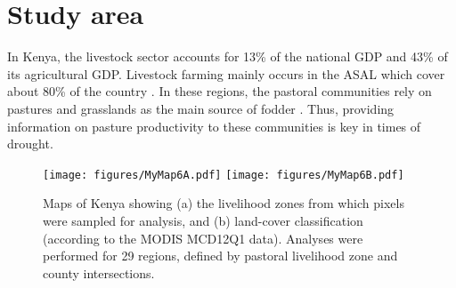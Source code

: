 \documentclass[review]{elsarticle}
\begin{document}
\section{Study area}
In Kenya, the livestock sector accounts for 13\% of the national GDP and 43\% of its agricultural GDP. Livestock farming mainly occurs in the ASAL which cover about 80\% of the country \citep{UNDP2013,FAO2014}. In these regions, the pastoral communities rely on pastures and grasslands as the main source of fodder \citep{Behnke2011}. Thus, providing information on pasture productivity to these communities is key in times of drought.


\begin{figure}
	\centering
	\texttt{[image: figures/MyMap6A.pdf]} \qquad \texttt{[image: figures/MyMap6B.pdf]}
	\caption{Maps of Kenya showing (a) the livelihood zones from which pixels were sampled for analysis, and (b) land-cover classification (according to the MODIS MCD12Q1 data). Analyses were performed for 29 regions, defined by pastoral livelihood zone and county intersections.} \label{fig:l_zone}
\end{figure}




\end{document}
